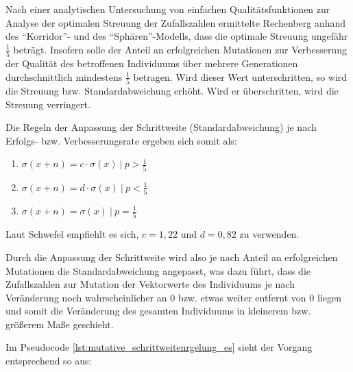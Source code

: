 Nach einer analytischen Untersuchung von einfachen Qualitätsfunktionen zur Analyse der optimalen Streuung der Zufallszahlen ermittelte Rechenberg anhand des \enquote{Korridor}- und des \enquote{Sphären}-Modells, dass die optimale Streuung ungefähr $\frac{1}{5}$ beträgt. Insofern solle der Anteil an erfolgreichen Mutationen zur Verbesserung der Qualität des betroffenen Individuums über mehrere Generationen durchschnittlich mindestens $\frac{1}{5}$ betragen. Wird dieser Wert unterschritten, so wird die Streuung bzw. Standardabweichung erhöht. Wird er überschritten, wird die Streuung verringert.

Die Regeln der Anpassung der Schrittweite (Standardabweichung) je nach Erfolgs- bzw. Verbesserungsrate ergeben sich somit als:

\begin{enumerate}
	\item $\sigma(x+n) = c \cdot \sigma(x)\ |\ p > \frac{1}{5}$
    \item $\sigma(x+n) = d \cdot \sigma(x)\ |\ p < \frac{1}{5}$
    \item $\sigma(x+n) = \sigma(x)\ |\ p = \frac{1}{5}$
\end{enumerate}

Laut Schwefel empfiehlt es sich, $c = 1,22$ und $d = 0,82$ zu verwenden.

Durch die Anpassung der Schrittweite wird also je nach Anteil an erfolgreichen Mutationen die Standardabweichung angepasst, was dazu führt, dass die Zufallszahlen zur Mutation der Vektorwerte des Individuums je nach Veränderung noch wahrscheinlicher an $0$ bzw. etwas weiter entfernt von $0$ liegen und somit die Veränderung des gesamten Individuums in kleinerem bzw. größerem Maße geschieht.

Im Pseudocode \ref{lst:mutative_schrittweitenrgelung_es} sieht der Vorgang entsprechend so aus:

